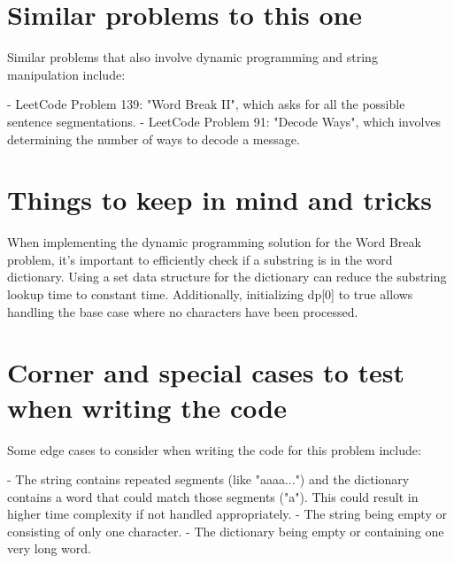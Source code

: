 \section*{Similar problems to this one}
Similar problems that also involve dynamic programming and string manipulation include:

- LeetCode Problem 139: "Word Break II", which asks for all the possible sentence segmentations.
- LeetCode Problem 91: "Decode Ways", which involves determining the number of ways to decode a message.
  
\section*{Things to keep in mind and tricks}
When implementing the dynamic programming solution for the Word Break problem, it's important to efficiently check if a substring is in the word dictionary. Using a set data structure for the dictionary can reduce the substring lookup time to constant time. Additionally, initializing dp[0] to true allows handling the base case where no characters have been processed.

\section*{Corner and special cases to test when writing the code}
Some edge cases to consider when writing the code for this problem include:

- The string contains repeated segments (like "aaaa...") and the dictionary contains a word that could match those segments ("a"). This could result in higher time complexity if not handled appropriately.
- The string being empty or consisting of only one character.
- The dictionary being empty or containing one very long word.